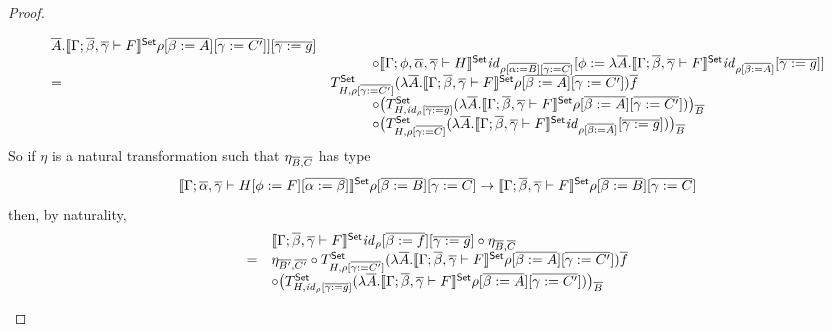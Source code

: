 \documentclass[acmsmall,review,anonymous]{acmart}
\theoremstyle{definition}
\newcommand{\set}{\mathsf{Set}}
\renewcommand{\id}{\mathit{id}}
\begin{document}
\begin{proof}
\begin{itemize}
\[\begin{array}{ll}
{    \ol{A}. \setsem{\Gamma; \ol{\beta}, \ol{\gamma} \vdash F} \rho
       [\ol{\beta := A}] [\ol{\gamma := C'}]]} [\ol{\gamma := g}] \\
&\hspace{3em} \circ \setsem{\Gamma; \phi, \ol{\alpha}, \ol{\gamma}
  \vdash H} \id_{\rho [\ol{\alpha := B}] [\ol{\gamma := C}]} [\phi :=
  \lambda \ol{A}. \setsem{\Gamma; \ol{\beta}, \ol{\gamma} \vdash F}
  \id_{\rho [\ol{\beta := A}]} [\ol{\gamma := g}]] \\
= & T^{\set}_{H,\rho [\ol{\gamma := C'}]} (\lambda
\ol{A}. \setsem{\Gamma; \ol{\beta}, \ol{\gamma} \vdash F} \rho
   [\ol{\beta := A}] [\ol{\gamma := C'}]) \ol{f} \\
&\hspace{3em} \circ \big( T^{\set}_{H,\id_{\rho}[\ol{\gamma := g}]}
   (\lambda \ol{A}. \setsem{\Gamma; \ol{\beta}, \ol{\gamma} \vdash F}
   \rho [\ol{\beta := A}] [\ol{\gamma := C'}]) \big)_{\ol{B}} \\
&\hspace{3em} \circ \big( T^{\set}_{H,\rho [\ol{\gamma := C}]} (\lambda
   \ol{A}. \setsem{\Gamma; \ol{\beta}, \ol{\gamma} \vdash F} \id_{\rho
     [\ol{\beta := A}]} [\ol{\gamma := g}]) \big)_{\ol{B}}
\end{array}\]
So if $\eta$ is a natural transformation such that $\eta_{\overline{B}, \overline{C}}$ has type
\[
\setsem{\Gamma; \ol{\alpha},
  \ol{\gamma} \vdash H[\phi := F][\ol{\alpha := \beta}]}\rho
[\ol{\beta := B}] [\ol{\gamma := C}]
\to
\setsem{\Gamma; \ol{\beta},
   \ol{\gamma} \vdash F}\rho [\ol{\beta := B}] [\ol{\gamma := C}]\]
then, by naturality,
\[\begin{array}{ll}
 & \setsem{\Gamma; \ol{\beta}, \ol{\gamma} \vdash F} \id_{\rho}
       [\ol{\beta := f}] [\ol{\gamma := g}] \circ \eta_{\ol{B},
         \ol{C}} \\ 
= & \eta_{\ol{B'}, \ol{C'}} \circ T^{\set}_{H,\rho [\ol{\gamma := C'}]}
(\lambda \ol{A}. \setsem{\Gamma; \ol{\beta}, \ol{\gamma} \vdash F}
\rho [\ol{\beta := A}] [\ol{\gamma := C'}]) \ol{f} \\
& \circ \big( T^{\set}_{H,\id_{\rho}[\ol{\gamma := g}]} (\lambda
\ol{A}. \setsem{\Gamma; \ol{\beta}, \ol{\gamma} \vdash F} \rho
   [\ol{\beta := A}] [\ol{\gamma := C'}]) \big)_{\ol{B}} \\

\end{array}\]
\end{itemize}
\end{proof}
\end{document}
